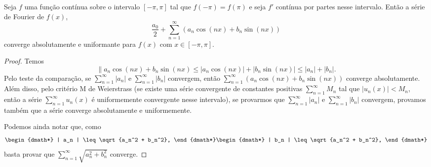 \begin{teo}
  Seja $f$ uma função contínua sobre o intervalo $[-\pi, \pi]$ tal que $f(-\pi)
  = f(\pi)$ e seja $f'$ contínua por partes nesse intervalo. Então a série de
  Fourier de $f(x)$,
  \begin{dmath*}
    \frac{a_0}{2} + \sum_{n = 1}^\infty \left( a_n \cos\left( n x \right) + b_n
    \sin\left( n x \right) \right)
  \end{dmath*}
  converge absolutamente e uniformante para $f(x)$ com $x \in [-\pi,\pi]$.
\end{teo}
\begin{proof}
  Temos
  \begin{dmath*}
    \| a_n \cos\left( n x \right) + b_n \sin\left( n x \right) \leq | a_n
    \cos\left( n x \right) | + | b_n \sin\left( n x \right) |
    \leq | a_n | + | b_n |.
  \end{dmath*}
  Pelo teste da comparação, se $\sum_{n = 1}^\infty | a_n |$ e $\sum_{n =
  1}^\infty | b_n |$ convergem, então $\sum_{n = 1}^\infty \left( a_n \cos\left(
  n x \right) + b_n \sin\left( n x \right) \right)$ converge absolutamente. Além
  disso, pelo critério M de Weierstrass (se existe uma série convergente de
  constantes positivas $\sum_{n = 1}^\infty M_n$ tal que $| u_n(x) | < M_n$,
  então a série $\sum_{n = 1}^\infty u_n(x)$ é uniformemente convergente nesse
  intervalo), se provarmos que $\sum_{n = 1}^\infty | a_n |$ e $\sum_{n =
  1}^\infty | b_n |$ convergem, provamos também que a série converge
  absolutamente e uniformemente.

  Podemos ainda notar que, como
  \begin{dgroup*}
    \begin{dmath*}
      | a_n | \leq \sqrt{a_n^2 + b_n^2},
    \end{dmath*}
    \begin{dmath*}
      | b_n | \leq \sqrt{a_n^2 + b_n^2},
    \end{dmath*}
  \end{dgroup*}
  basta provar que $\sum_{n = 1}^\infty \sqrt{a_n^2 + b_n^2}$ converge.


\end{proof}
